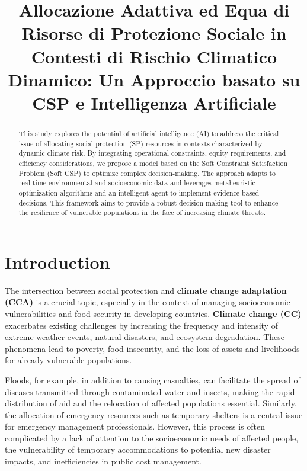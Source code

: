 \documentclass[letterpaper]{article}
\title{Allocazione Adattiva ed Equa di Risorse di Protezione Sociale in Contesti di Rischio Climatico Dinamico: Un Approccio basato su CSP e Intelligenza Artificiale}
\author{}
\date{}
\begin{document}
\maketitle

\begin{abstract}
    This study explores the potential of artificial intelligence (AI) to
    address the critical issue of allocating social protection (SP)
    resources in contexts characterized by dynamic climate risk. By
    integrating operational constraints, equity requirements, and
    efficiency considerations, we propose a model based on the Soft
    Constraint Satisfaction Problem (Soft CSP) to optimize complex
    decision-making. The approach adapts to real-time environmental
    and socioeconomic data and leverages metaheuristic optimization
    algorithms and an intelligent agent to implement evidence-based
    decisions. This framework aims to provide a robust
    decision-making tool to enhance the resilience of vulnerable
    populations in the face of increasing climate threats.

\end{abstract}

\section{Introduction}
The intersection between social protection and \textbf{climate
    change adaptation (CCA)} is a crucial topic, especially in the
context of managing socioeconomic vulnerabilities and food security
in developing countries. \textbf{Climate change (CC)} exacerbates
existing challenges by increasing the frequency and intensity of
extreme weather events, natural disasters, and ecosystem degradation.
These phenomena lead to poverty, food insecurity, and the loss of
assets and livelihoods for already vulnerable populations.
\cite{bagolle2023social}

Floods, for example, in addition to causing casualties, can
facilitate the spread of diseases transmitted through contaminated
water and insects, making the rapid distribution of aid and the
relocation of affected populations essential. Similarly, the
allocation of emergency resources such as temporary shelters is a
central issue for emergency management professionals. However, this
process is often complicated by a lack of attention to the
socioeconomic needs of affected people, the vulnerability of
temporary accommodations to potential new disaster impacts, and
inefficiencies in public cost management.
\end{document}
